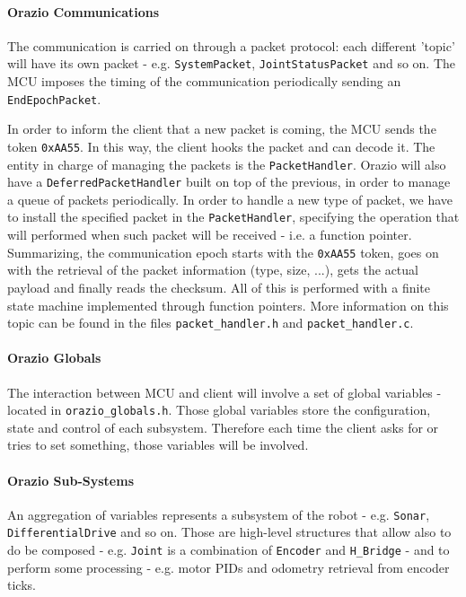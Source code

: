 \documentclass[10pt,a4paper, notitlepage]{report}
\begin{document}
\paragraph{Orazio Communications} The communication is carried on through a packet protocol: each different 'topic' will have its own packet - e.g. \texttt{SystemPacket}, \texttt{JointStatusPacket} and so on. The MCU imposes the timing of the communication periodically sending an \texttt{EndEpochPacket}.

In order to inform the client that a new packet is coming, the MCU sends the token \texttt{0xAA55}. In this way, the client hooks the packet and can decode it. The entity in charge of managing the packets is the \texttt{PacketHandler}. Orazio will also have a \texttt{DeferredPacketHandler} built on top of the previous, in order to manage a queue of packets periodically. In order to handle a new type of packet, we have to install the specified packet in the \texttt{PacketHandler}, specifying the operation that will performed when such packet will be received - i.e. a function pointer. Summarizing, the communication epoch starts with the \texttt{0xAA55} token, goes on with the retrieval of the packet information (type, size, ...), gets the actual payload and finally reads the checksum. All of this is performed with a finite state machine implemented through function pointers. More information on this topic can be found in the files \texttt{packet\_handler.h} and \texttt{packet\_handler.c}.

\paragraph{Orazio Globals} The interaction between MCU and client will involve a set of global variables - located in \texttt{orazio\_globals.h}. Those global variables store the configuration, state and control of each subsystem. Therefore each time the client asks for or tries to set something, those variables will be involved.

\paragraph{Orazio Sub-Systems} An aggregation of variables represents a subsystem of the robot - e.g. \texttt{Sonar}, \texttt{DifferentialDrive} and so on. Those are high-level structures that allow also to do be composed - e.g. \texttt{Joint} is a combination of \texttt{Encoder} and \texttt{H\_Bridge} - and to perform some processing - e.g. motor PIDs and odometry retrieval from encoder ticks.
\end{document}

